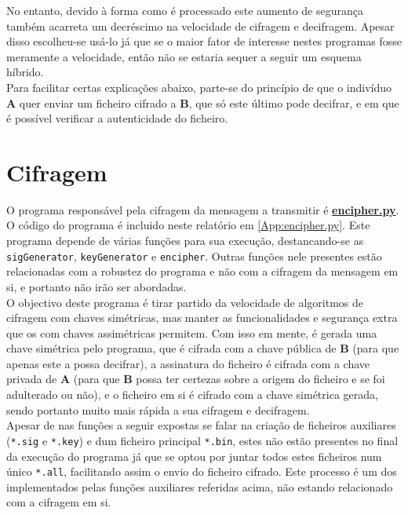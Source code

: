 \documentclass[a4paper,11pt,openright,oneside]{report}
\begin{document}
No entanto, devido à forma como é processado este aumento de segurança também acarreta um decréscimo na velocidade de cifragem e decifragem. Apesar disso escolheu-se usá-lo já que se o maior fator de interesse nestes programas fosse meramente a velocidade, então não se estaria sequer a seguir um esquema híbrido.\\

Para facilitar certas explicações abaixo, parte-se do princípio de que o indivíduo \textbf{A} quer enviar um ficheiro cifrado a \textbf{B}, que só este último pode decifrar, e em que é possível verificar a autenticidade do ficheiro.

\section{Cifragem}

O programa responsável pela cifragem da mensagem a transmitir é \href{run:../Python/Sender/encipher.py}{\textbf{encipher.py}}. O código do programa é incluido neste relatório em \ref{App:encipher.py}.
Este programa depende de várias funções para sua execução, destancando-se as \verb|sigGenerator|, \verb|keyGenerator| e \verb|encipher|. Outras funções nele presentes estão relacionadas com a robustez do programa e não com a cifragem da mensagem em si, e portanto não irão ser abordadas.\\

O objectivo deste programa é tirar partido da velocidade de algoritmos de cifragem com chaves simétricas, mas manter as funcionalidades e segurança extra que os com chaves assimétricas permitem. Com isso em mente, é gerada uma chave simétrica pelo programa, que é cifrada com a chave pública de \textbf{B} (para que apenas este a possa decifrar), a assinatura do ficheiro é cifrada com a chave privada de \textbf{A} (para que \textbf{B} possa ter certezas sobre a origem do ficheiro e se foi adulterado ou não), e o ficheiro em si é cifrado com a chave simétrica gerada, sendo portanto muito mais rápida a sua cifragem e decifragem.\\

Apesar de nas funções a seguir expostas se falar na criação de ficheiros auxiliares (\verb|*.sig| e \verb|*.key|) e dum ficheiro principal \verb|*.bin|, estes não estão presentes no final da execução do programa já que se optou por juntar todos estes ficheiros num único \verb|*.all|, facilitando assim o envio do ficheiro cifrado. Este processo é um dos implementados pelas funções auxiliares referidas acima, não estando relacionado com a cifragem em si.
\end{document}
